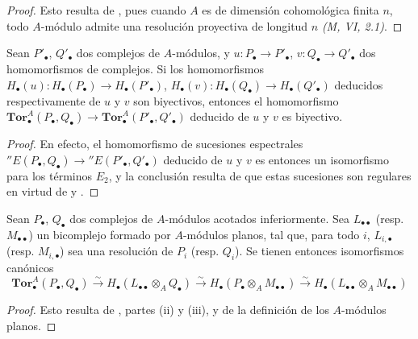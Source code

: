 \begin{proof}
Esto resulta de , pues cuando $A$ es de dimensión
cohomológica
finita $n$, todo $A$-módulo admite una resolución proyectiva de longitud $n$
\emph{(M, VI, 2.1)}.
\end{proof}

\begin{corollary}[6.3.3]
\label{III.6.3.3}
Sean $P'_\bullet$, $Q'_\bullet$ dos complejos de $A$-módulos, y
$u:P_\bullet\to P'_\bullet$, $v:Q_\bullet\to Q'_\bullet$ dos homomorfismos
de complejos. Si los homomorfismos
$H_\bullet(u):H_\bullet(P_\bullet)\to H_\bullet(P'_\bullet)$,
$H_\bullet(v):H_\bullet(Q_\bullet)\to H_\bullet(Q'_\bullet)$ deducidos
respectivamente de $u$ y $v$ son biyectivos, entonces el homomorfismo
$\mathbf{Tor}_\bullet^A(P_\bullet,Q_\bullet)\to
\mathbf{Tor}_\bullet^A(P'_\bullet,Q'_\bullet)$ deducido de $u$ y $v$ es
biyectivo.
\end{corollary}

\begin{proof}
En efecto, el homomorfismo de sucesiones espectrales
$''E(P_\bullet,Q_\bullet)\to''E(P'_\bullet,Q'_\bullet)$ deducido de $u$ y $v$
es entonces un isomorfismo para los términos $E_2$, y la conclusión resulta
de que estas sucesiones son regulares en virtud de  y
.
\end{proof}

\begin{proposition}[6.3.4]
\label{III.6.3.4}
Sean $P_\bullet$, $Q_\bullet$ dos complejos de $A$-módulos acotados
inferiormente. Sea $L_{\bullet\bullet}$ \textup{(resp. $M_{\bullet\bullet}$)} un
bicomplejo formado por $A$-módulos planos, tal que, para todo $i$,
$L_{i,\bullet}$ \textup{(resp. $M_{i,\bullet}$)} sea una resolución de $P_i$
\textup{(resp. $Q_i$)}. Se tienen entonces isomorfismos canónicos
\[
  \mathbf{Tor}_\bullet^A(P_\bullet,Q_\bullet)
  \xrightarrow{\sim}H_\bullet(L_{\bullet\bullet}\otimes_AQ_\bullet)
  \xrightarrow{\sim}H_\bullet(P_\bullet\otimes_AM_{\bullet\bullet})
  \xrightarrow{\sim}H_\bullet(L_{\bullet\bullet}\otimes_AM_{\bullet\bullet})
  \tag{6.3.4.1}\label{III.6.3.4.1.fr}
\]
\end{proposition}

\begin{proof}
Esto resulta de , partes (ii) y (iii), y de la definición
de los
$A$-módulos planos.
\end{proof}

